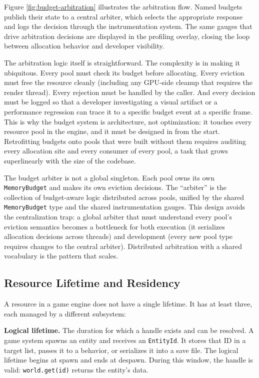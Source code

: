 \documentclass[
  11pt,
  letterpaper,
  DIV=11,
  numbers=noendperiod,
  twoside,
  open=right]{scrreprt}
\begin{document}
Figure \ref{fig:budget-arbitration} illustrates the arbitration flow.
Named budgets publish their state to a central arbiter, which selects
the appropriate response and logs the decision through the
instrumentation system. The same gauges that drive arbitration decisions
are displayed in the profiling overlay, closing the loop between
allocation behavior and developer visibility.



The arbitration logic itself is straightforward. The complexity is in
making it ubiquitous. Every pool must check its budget before
allocating. Every eviction must free the resource cleanly (including any
GPU-side cleanup that requires the render thread). Every rejection must
be handled by the caller. And every decision must be logged so that a
developer investigating a visual artifact or a performance regression
can trace it to a specific budget event at a specific frame. This is why
the budget system is architecture, not optimization: it touches every
resource pool in the engine, and it must be designed in from the start.
Retrofitting budgets onto pools that were built without them requires
auditing every allocation site and every consumer of every pool, a task
that grows superlinearly with the size of the codebase.

The budget arbiter is not a global singleton. Each pool owns its own
\texttt{MemoryBudget} and makes its own eviction decisions. The
``arbiter'' is the collection of budget-aware logic distributed across
pools, unified by the shared \texttt{MemoryBudget} type and the shared
instrumentation gauges. This design avoids the centralization trap: a
global arbiter that must understand every pool's eviction semantics
becomes a bottleneck for both execution (it serializes allocation
decisions across threads) and development (every new pool type requires
changes to the central arbiter). Distributed arbitration with a shared
vocabulary is the pattern that scales.

\subsection{Resource Lifetime and
Residency}\label{sec-lifetime-residency}

A resource in a game engine does not have a single lifetime. It has at
least three, each managed by a different subsystem:

\textbf{Logical lifetime.} The duration for which a handle exists and
can be resolved. A game system spawns an entity and receives an
\texttt{EntityId}. It stores that ID in a target list, passes it to a
behavior, or serializes it into a save file. The logical lifetime begins
at spawn and ends at despawn. During this window, the handle is valid:
\texttt{world.get(id)} returns the entity's data.
\end{document}
